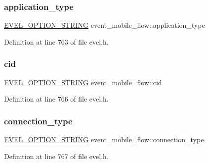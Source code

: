 \subsubsection{\texorpdfstring{application\+\_\+type}{application\_type}}
{\footnotesize\ttfamily \hyperlink{evel_8h_a0de5113a7b72de93c0c7b644f7ea7ec3}{E\+V\+E\+L\+\_\+\+O\+P\+T\+I\+O\+N\+\_\+\+S\+T\+R\+I\+NG} event\+\_\+mobile\+\_\+flow\+::application\+\_\+type}



Definition at line 763 of file evel.\+h.

\hypertarget{structevent__mobile__flow_a18a338f6d1031fd2a5e6bc96e8d33027}{}\label{structevent__mobile__flow_a18a338f6d1031fd2a5e6bc96e8d33027} 
\subsubsection{\texorpdfstring{cid}{cid}}
{\footnotesize\ttfamily \hyperlink{evel_8h_a0de5113a7b72de93c0c7b644f7ea7ec3}{E\+V\+E\+L\+\_\+\+O\+P\+T\+I\+O\+N\+\_\+\+S\+T\+R\+I\+NG} event\+\_\+mobile\+\_\+flow\+::cid}



Definition at line 766 of file evel.\+h.

\hypertarget{structevent__mobile__flow_a5cb4efa1bf6c21ec2ff624659e9c24ca}{}\label{structevent__mobile__flow_a5cb4efa1bf6c21ec2ff624659e9c24ca} 
\subsubsection{\texorpdfstring{connection\+\_\+type}{connection\_type}}
{\footnotesize\ttfamily \hyperlink{evel_8h_a0de5113a7b72de93c0c7b644f7ea7ec3}{E\+V\+E\+L\+\_\+\+O\+P\+T\+I\+O\+N\+\_\+\+S\+T\+R\+I\+NG} event\+\_\+mobile\+\_\+flow\+::connection\+\_\+type}



Definition at line 767 of file evel.\+h.

\hypertarget{structevent__mobile__flow_a62eb47084718afbf58888eb5dc24da48}{}\label{structevent__mobile__flow_a62eb47084718afbf58888eb5dc24da48} 
